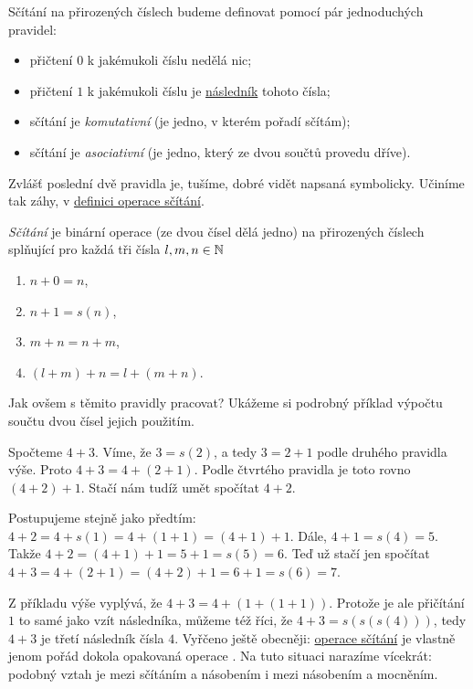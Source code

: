 Sčítání na přirozených číslech budeme definovat pomocí pár jednoduchých
pravidel:
\begin{itemize}
  \item přičtení $0$ k jakémukoli číslu nedělá nic;
  \item přičtení $1$ k jakémukoli číslu je \hyperref[def:naslednik]{následník}
    tohoto čísla;
  \item sčítání je \emph{komutativní} (je jedno, v kterém pořadí sčítám);
  \item sčítání je \emph{asociativní} (je jedno, který ze dvou součtů provedu
    dříve).
\end{itemize}

Zvlášť poslední dvě pravidla je, tušíme, dobré vidět napsaná symbolicky. Učiníme
tak záhy, v \hyperref[def:scitani]{definici operace sčítání}.

\begin{definition}[Sčítání]
  \label{def:scitani}
  \emph{Sčítání} je binární operace (ze dvou čísel dělá jedno) na přirozených
  číslech splňující pro každá tři čísla $l, m, n \in \mathbb{N}$
  \begin{enumerate}
    \item $n + 0 = n$,
    \item $n + 1 = s(n)$,
    \item $m + n = n + m$,
    \item $(l + m) + n = l + (m + n)$.
  \end{enumerate}
\end{definition}

Jak ovšem s těmito pravidly pracovat? Ukážeme si podrobný příklad výpočtu součtu
dvou čísel jejich použitím.

\begin{example}
  \label{exam:scitani}
  Spočteme $4 + 3$. Víme, že $3 = s(2)$, a tedy $3 = 2 + 1$ podle druhého
  pravidla výše. Proto $4 + 3 = 4 + (2 + 1)$. Podle čtvrtého pravidla je toto
  rovno $(4 + 2) + 1$. Stačí nám tudíž umět spočítat $4 + 2$.

  Postupujeme stejně jako předtím: $4 + 2 = 4 + s(1) = 4 + (1 + 1) = (4 + 1) +
  1$. Dále, $4 + 1 = s(4) = 5$. Takže $4 + 2 = (4 + 1) + 1 = 5 + 1 = s(5) = 6$.
  Teď už stačí jen spočítat $4 + 3 = 4 + (2 + 1) = (4 + 2) + 1 = 6 + 1 = s(6) =
  7$.
\end{example}

\begin{remark}
  Z příkladu výše vyplývá, že $4 + 3 = 4 + (1 + (1 + 1))$. Protože je ale
  přičítání $1$ to samé jako vzít následníka, můžeme též říci, že $4 + 3 =
  s(s(s(4)))$, tedy $4 + 3$ je třetí následník čísla $4$. Vyřčeno ještě
  obecněji: \hyperref[def:scitani]{operace sčítání} je vlastně jenom pořád
  dokola opakovaná operace . Na tuto situaci narazíme
  vícekrát: podobný vztah je mezi sčítáním a násobením i mezi násobením a
  mocněním.
\end{remark}

